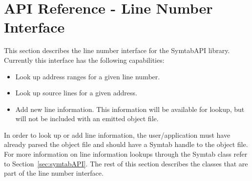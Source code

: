 \section{API Reference - Line Number Interface}
\label{LineNoInterface}

This section describes the line number interface for the SymtabAPI library. Currently this interface has the following capabilities:
\begin{itemize}
\item Look up address ranges for a given line number.
\item Look up source lines for a given address.
\item Add new line information. This information will be available for lookup, but will not be included with an emitted object file.
\end{itemize}

In order to look up or add line information, the user/application must have already parsed the object file and should have a Symtab handle to the object file. For more information on line information lookups through the Symtab class refer to Section~\ref{sec:symtabAPI}. The rest of this section describes the classes that are part of the line number interface.




